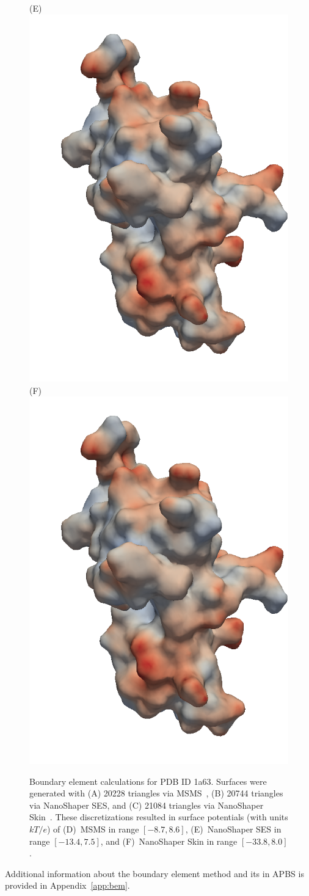 \documentclass[12pt,titlepage]{article}
\begin{document}
\begin{figure}
	\hspace{-10pt}
	(E)~\hspace{-3pt}\includegraphics[angle=0,width=0.25\linewidth]{NSSES}
	\hspace{-10pt} 
	(F)~\hspace{-3pt}\includegraphics[angle=0,width=0.25\linewidth]{NSSkin}
	\hspace{-5pt}
	\caption{Boundary element calculations for PDB ID 1a63.
		Surfaces were generated with (A) 20228 triangles via MSMS~\cite{Sanner1995}, (B) 20744 triangles via NanoShaper SES, and (C) 21084 triangles via NanoShaper Skin~\cite{Decherchi2013}.
		These discretizations resulted in surface potentials (with units $kT/e$) of (D)~MSMS in range $[-8.7, 8.6]$, (E)~NanoShaper SES in range $[-13.4, 7.5]$, and (F)~NanoShaper Skin in range $[-33.8, 8.0]$.
		\label{fig:surface-potential}
		\label{fig:surface-mesher}}
\end{figure}
Additional information about the boundary element method and its in APBS is provided in Appendix~\ref{app:bem}.
\end{document}
